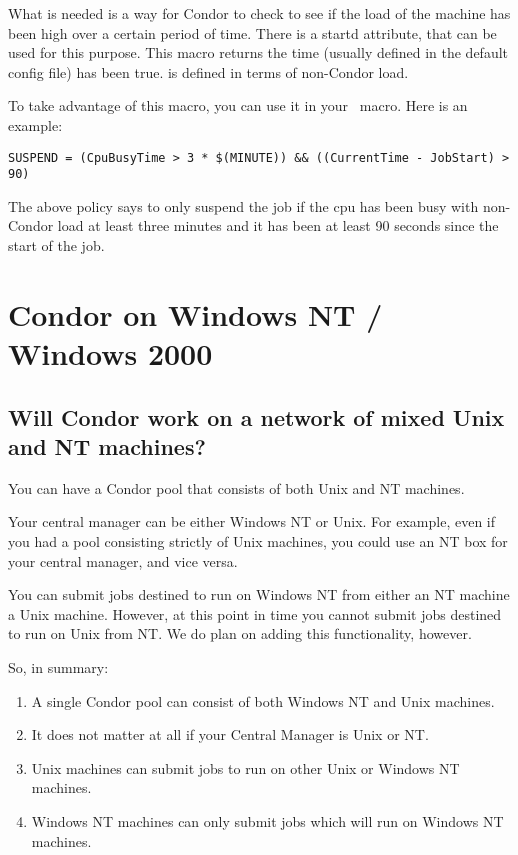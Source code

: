 What is needed is a way for Condor to check to see if the load of the machine
has been high over a certain period of time. There is a startd attribute,
 that can be used for this purpose. This macro
returns the time (usually defined in the default
config file) has been true.  is defined in terms of
non-Condor load.

To take advantage of this macro, you can use it in your \ macro.
Here is an example:
\begin{verbatim}
SUSPEND = (CpuBusyTime > 3 * $(MINUTE)) && ((CurrentTime - JobStart) > 90)
\end{verbatim}

The above policy says to only suspend the job if the cpu has been busy
with non-Condor load at least three minutes and it has been at least 90
seconds since the start of the job.

\section{Condor on Windows NT / Windows 2000}

\subsection{Will Condor work on a network of mixed Unix and NT machines?}

You can have a Condor pool that consists of both Unix and NT machines.

Your central manager can be either Windows NT or Unix.  For example,
even if you had a pool consisting strictly of Unix machines, you could
use an NT box for your central manager, and vice versa.

You can submit jobs destined to run on Windows NT from either an NT
machine  a Unix machine.  However, at this point in time you
cannot submit jobs destined to run on Unix from NT.  We do plan on
adding this functionality, however.

So, in summary:

\begin{enumerate}

\item{A single Condor pool can consist of both Windows NT and Unix
machines.}

\item{It does not matter at all if your Central Manager is Unix or NT.}

\item{Unix machines can submit jobs to run on other Unix or Windows NT
machines.}

\item{Windows NT machines can only submit jobs which will run on Windows
NT machines.}

\end{enumerate}


